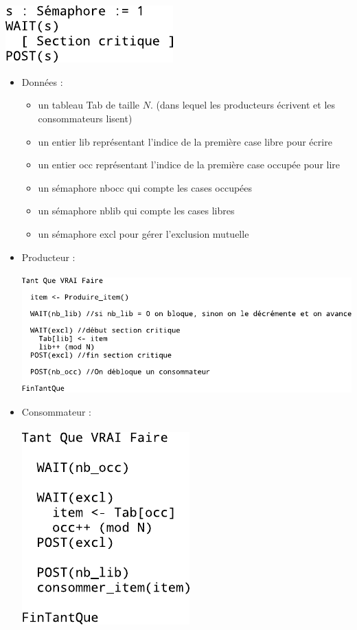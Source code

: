  \\
\\	\includegraphics{fig16.pdf} \\
\begin{itemize}
	\item Données : 
	\begin{itemize}
		\item un tableau Tab de taille $N$. (dans lequel les producteurs écrivent et les consommateurs lisent)
		\item un entier lib représentant l'indice de la première case libre pour écrire
		\item un entier occ représentant l'indice de la première case occupée pour lire
		\item un sémaphore nbocc qui compte les cases occupées
		\item un sémaphore nblib qui compte les cases libres
		\item un sémaphore excl pour gérer l'exclusion mutuelle
	\end{itemize}
	\item Producteur : \\
\\ 
\includegraphics{fig17.pdf}
	\item Consommateur : \\
\\ 
\includegraphics{fig18.pdf}
\end{itemize}

